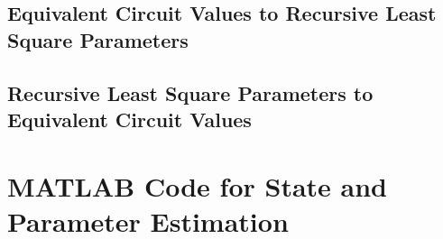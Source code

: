 \documentclass[12pt]{article}
\begin{document}
\subsection{Equivalent Circuit Values to Recursive Least Square Parameters}

 
\label{Equivalent_circuit_value_to_RLCS_parameters}

\subsection{Recursive Least Square Parameters to Equivalent Circuit Values }\label{RLCS_parameters_to_equivalent_circuit_value}

 

\section{MATLAB Code for State and Parameter Estimation}
\label{RLS_and_AEFK}
 
\end{document}
